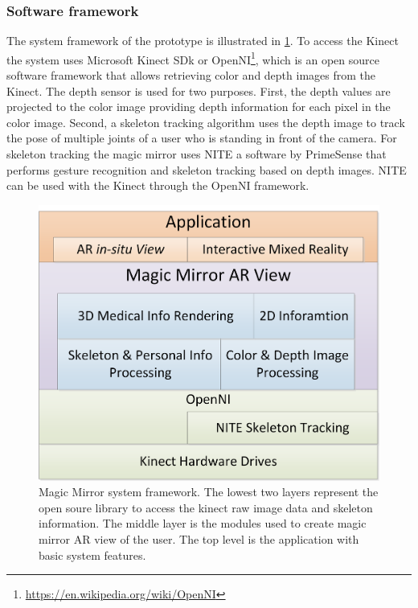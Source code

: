 \subsubsection{Software framework}
The system framework of the prototype is illustrated in \figurename{\ref{fig:3-MMC:systemFramework}}.
To access the Kinect the system uses Microsoft Kinect SDk or OpenNI\footnote{\url{https://en.wikipedia.org/wiki/OpenNI}}, which is an open source software framework that allows retrieving color and depth images from the Kinect. The depth sensor is used for two purposes. First, the depth values are projected to the color image providing depth information for each pixel in the color image. Second, a skeleton tracking algorithm uses the depth image to track the pose of multiple joints of a user who is standing in front of the camera. For skeleton tracking the magic mirror uses NITE a software by PrimeSense that performs gesture recognition and skeleton tracking based on depth images. NITE can be used with the Kinect through the OpenNI framework.
\begin{figure}
	\centering
	\includegraphics[width = 0.7\linewidth]{figures/3-MMC/SystemFramework}
	\caption[Magic Mirror system framework]{Magic Mirror system framework. The lowest two layers represent the open soure library to access the kinect raw image data and skeleton information. The middle layer is the modules used to create magic mirror AR view of the user. The top level is the application with basic system features.}
	\label{fig:3-MMC:systemFramework}
\end{figure}

